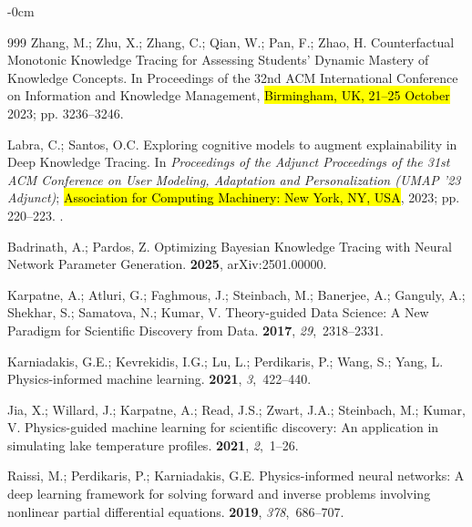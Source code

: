 \documentclass[applsci,article,accept,moreauthors,pdftex]{Definitions/mdpi}
\begin{document}
\begin{adjustwidth}{-\extralength}{0cm}
\begin{thebibliography}{999}
Zhang, M.; Zhu, X.; Zhang, C.; Qian, W.; Pan, F.; Zhao, H.
\newblock Counterfactual Monotonic Knowledge Tracing for Assessing Students'
  Dynamic Mastery of Knowledge Concepts.
\newblock In Proceedings of the 32nd ACM International
  Conference on Information and Knowledge Management, \hl{Birmingham, UK, 21--25 October} 2023; pp. 3236--3246.

Labra, C.; Santos, O.C.
\newblock Exploring cognitive models to augment explainability in Deep
  Knowledge Tracing.
\newblock In \textit{Proceedings of the Adjunct Proceedings of the 31st ACM Conference
  on User Modeling, Adaptation and Personalization (UMAP '23 Adjunct)}; \hl{Association for Computing Machinery: New York, NY, USA},  2023;
  pp. 220--223.
.

Badrinath, A.; Pardos, Z.
\newblock Optimizing Bayesian Knowledge Tracing with Neural Network Parameter
  Generation.
 {\bf 2025}, arXiv:2501.00000.

Karpatne, A.; Atluri, G.; Faghmous, J.; Steinbach, M.; Banerjee, A.; Ganguly,
  A.; Shekhar, S.; Samatova, N.; Kumar, V.
\newblock Theory-guided Data Science: A New Paradigm for Scientific Discovery
  from Data.
 {\bf 2017},
  {\em 29},~2318--2331.

Karniadakis, G.E.; Kevrekidis, I.G.; Lu, L.; Perdikaris, P.; Wang, S.; Yang, L.
\newblock Physics-informed machine learning.
 {\bf 2021}, {\em 3},~422--440.

Jia, X.; Willard, J.; Karpatne, A.; Read, J.S.; Zwart, J.A.; Steinbach, M.;
  Kumar, V.
\newblock Physics-guided machine learning for scientific discovery: An
  application in simulating lake temperature profiles.
 {\bf 2021}, {\em
  2},~1--26.

Raissi, M.; Perdikaris, P.; Karniadakis, G.E.
\newblock Physics-informed neural networks: A deep learning framework for
  solving forward and inverse problems involving nonlinear partial differential
  equations.
 {\bf 2019}, {\em
  378},~686--707.


\end{thebibliography}
\end{adjustwidth}
\end{document}
